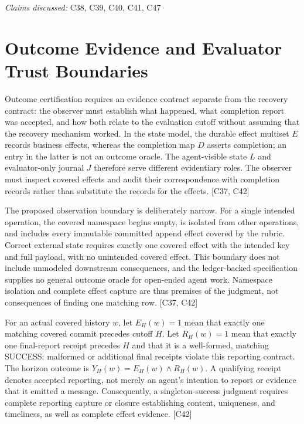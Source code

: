 \documentclass[11pt]{article}
\begin{document}
\textit{Claims discussed: }C38, C39, C40, C41, C47
\section{Outcome Evidence and Evaluator Trust Boundaries}
Outcome certification requires an evidence contract separate from the recovery contract: the observer must establish what happened, what completion report was accepted, and how both relate to the evaluation cutoff without assuming that the recovery mechanism worked. In the state model, the durable effect multiset $E$ records business effects, whereas the completion map $D$ asserts completion; an entry in the latter is not an outcome oracle. The agent-visible state $L$ and evaluator-only journal $J$ therefore serve different evidentiary roles. The observer must inspect covered effects and audit their correspondence with completion records rather than substitute the records for the effects. [C37, C42]

The proposed observation boundary is deliberately narrow. For a single intended operation, the covered namespace begins empty, is isolated from other operations, and includes every immutable committed append effect covered by the rubric. Correct external state requires exactly one covered effect with the intended key and full payload, with no unintended covered effect. This boundary does not include unmodeled downstream consequences, and the ledger-backed specification supplies no general outcome oracle for open-ended agent work. Namespace isolation and complete effect capture are thus premises of the judgment, not consequences of finding one matching row. [C37, C42]

For an actual covered history $w$, let $E_H(w)=1$ mean that exactly one matching covered commit precedes cutoff $H$. Let $R_H(w)=1$ mean that exactly one final-report receipt precedes $H$ and that it is a well-formed, matching SUCCESS; malformed or additional final receipts violate this reporting contract. The horizon outcome is $Y_H(w)=E_H(w)\land R_H(w)$. A qualifying receipt denotes accepted reporting, not merely an agent's intention to report or evidence that it emitted a message. Consequently, a singleton-success judgment requires complete reporting capture or closure establishing content, uniqueness, and timeliness, as well as complete effect evidence. [C42]
\end{document}
